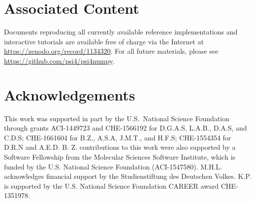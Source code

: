 \documentclass[journal=jctcce,manuscript=article]{achemso}
\begin{document}
\section{Associated Content\label{sec:si}}
Documents reproducing all currently available reference implementations and interactive tutorials are available free of charge via the Internet at \url{https://zenodo.org/record/1134320}. For all future materials, please see \url{https://github.com/psi4/psi4numpy}.

\section{Acknowledgements}
This work was supported in part by the U.S.~National Science Foundation through grants ACI-1449723 and CHE-1566192 for D.G.A.S, L.A.B., D.A.S, and C.D.S; CHE-1661604 for B.Z., A.S.A, J.M.T., and H.F.S; CHE-1554354 for D.R.N and A.E.D. B. Z. contributions to this work were also supported by a Software Fellowship from the Molecular Sciences Software Institute, which is funded by the U.S. National Science Foundation (ACI-1547580).  M.H.L. acknowledges financial support by the Studienstiftung des Deutschen Volkes. K.P.  is supported by the U.S. National Science Foundation CAREER award CHE-1351978.

\newpage

\end{document}
